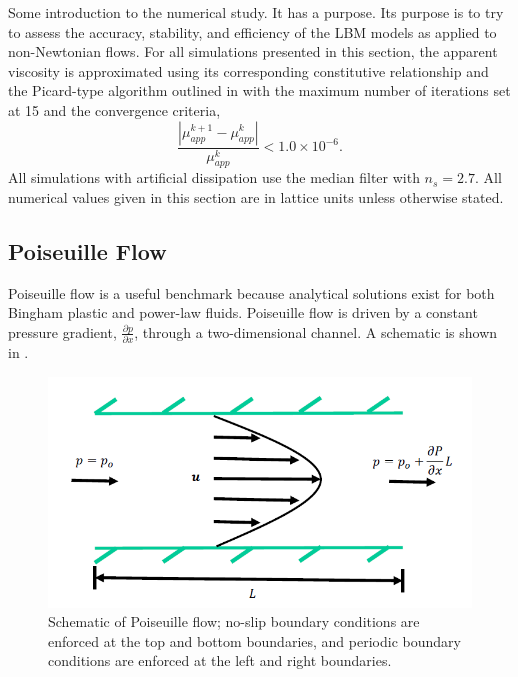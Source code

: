 \documentclass{article}
\begin{document}
Some introduction to the numerical study.
It has a purpose.
Its purpose is to try to assess the accuracy, stability, and efficiency of the LBM models as applied to non-Newtonian flows.
For all simulations presented in this section, the apparent viscosity is approximated using its corresponding constitutive relationship and the Picard-type algorithm outlined in  with the maximum number of iterations set at 15 and the convergence criteria,
\begin{equation} \label{eq:mu-app-conv}
\frac{\left|\mu_{app}^{k+1} - \mu_{app}^{k}\right|}{\mu_{app}^{k}} < 1.0 \times 10^{-6}.
\end{equation}
All simulations with artificial dissipation use the median filter with $n_s = 2.7$.
All numerical values given in this section are in lattice units unless otherwise stated.

\newcommand{\pgrad}{\frac{\partial p}{\partial x}}

\subsection{Poiseuille Flow}

Poiseuille flow is a useful benchmark because analytical solutions exist for both Bingham plastic and power-law fluids.
Poiseuille flow is driven by a constant pressure gradient, $\pgrad$, through a two-dimensional channel.
A schematic is shown in .

\begin{figure}
    \includegraphics[width=\linewidth]{figs/poise-schematic}
    \caption{Schematic of Poiseuille flow; no-slip boundary conditions are enforced at the top and bottom boundaries, and periodic boundary conditions are enforced at the left and right boundaries.}
    \label{fig:poise-schematic}
\end{figure}
\end{document}
